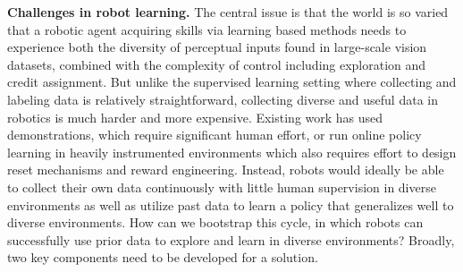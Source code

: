 \vspace{5mm}

\textbf{Challenges in robot learning.} The central issue is that the world is so varied that a robotic agent acquiring skills via learning based methods needs to experience both the diversity of perceptual inputs found in large-scale vision datasets, combined with the complexity of control including exploration and credit assignment.
But unlike the supervised learning setting where collecting and labeling data is relatively straightforward, collecting diverse and useful data in robotics is much harder and more expensive.
Existing work has used demonstrations, which require significant human effort, or run online policy learning in heavily instrumented environments which also requires effort to design reset mechanisms and reward engineering.
Instead, robots would ideally be able to collect their own data continuously with little human supervision in diverse environments as well as utilize past data to learn a policy that generalizes well to diverse environments.
How can we bootstrap this cycle, in which robots can successfully use prior data to explore and learn in diverse environments?
Broadly, two key components need to be developed for a solution.

